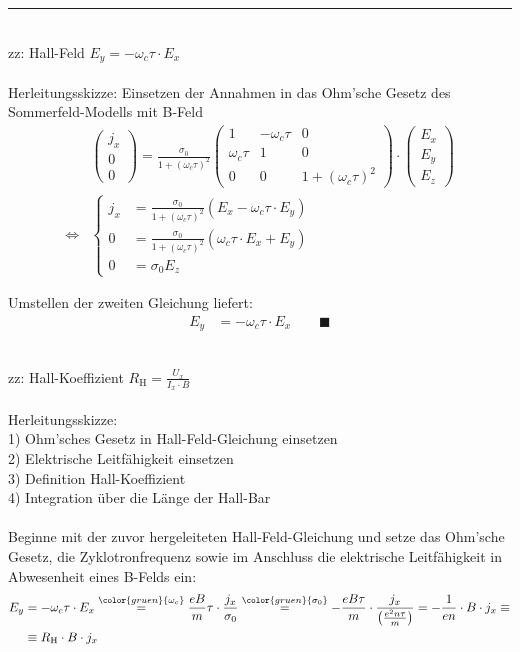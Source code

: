 \documentclass{article}
\newcommand{\lr}[1]{\left(#1\right)}
\newcommand{\comment}[1]{{\color{gruen}{#1}}}
\begin{document}
\newpage


{\color{violet}
\hrule
	\\
	zz: Hall-Feld $E_y = -\omega_c \tau \cdot E_x$\\
	\\
	Herleitungsskizze: Einsetzen der Annahmen in das Ohm'sche Gesetz des Sommerfeld-Modells mit B-Feld
		\begin{align*}
			&\begin{pmatrix}
				j_x \\ 0 \\ 0
			\end{pmatrix}
			=
			\frac{\sigma_0}{1 + (\omega_c\tau)^2}
			\begin{pmatrix}
				1 & -\omega_c\tau & 0 \\
				\omega_c\tau & 1 & 0 \\
				0 & 0 & 1 + (\omega_c\tau)^2
			\end{pmatrix}
			\cdot
			\begin{pmatrix}
				E_x \\ E_y \\ E_z
			\end{pmatrix} \\
			\Leftrightarrow &
			\begin{cases}
				j_x &= \frac{\sigma_0}{1 + (\omega_c\tau)^2} \lr{ E_x - \omega_c\tau \cdot E_y } \\
				0 &= \frac{\sigma_0}{1 + (\omega_c\tau)^2} \lr{ \omega_c\tau \cdot E_x + E_y } \\
				0 &= \sigma_0 E_z
			\end{cases}
		\end{align*}
	
	Umstellen der zweiten Gleichung liefert:
		\begin{align*}
			E_y &= -\omega_c\tau \cdot E_x \qquad \blacksquare
		\end{align*}


	\\
	zz: Hall-Koeffizient $R_\text{H} = \frac{U_x}{I_x \cdot B}$\\
	\\
	Herleitungsskizze:\\
	1) Ohm'sches Gesetz in Hall-Feld-Gleichung einsetzen \\
	2) Elektrische Leitfähigkeit einsetzen \\
	3) Definition Hall-Koeffizient \\
	4) Integration über die Länge der Hall-Bar \\
	\\
	Beginne mit der zuvor hergeleiteten Hall-Feld-Gleichung und setze das Ohm'sche Gesetz, die Zyklotronfrequenz sowie im Anschluss die elektrische Leitfähigkeit in Abwesenheit eines B-Felds ein:
		\begin{align*}
			E_y &= -\omega_c\tau \cdot E_x \stackrel{\comment{\omega_c}}{=} \frac{eB}{m} \tau \cdot \frac{j_x}{\sigma_0} \stackrel{\comment{\sigma_0}}{=} -\frac{eB\tau}{m} \cdot \frac{j_x}{\lr{ \frac{e^2n\tau}{m} }} = -\frac{1}{en} \cdot B \cdot j_x \equiv\\
			&\equiv R_\text{H} \cdot B \cdot j_x
		\end{align*}

}
\end{document}
